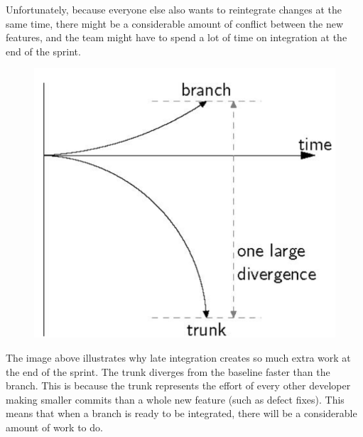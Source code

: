\documentclass[a4paper, openany]{memoir}
\begin{document}
Unfortunately, because everyone else also wants to reintegrate changes at the same time, there might be a considerable amount of conflict between the new features, and the team might have to spend a lot of time on integration at the end of the sprint.

\begin{figure}[H]
    \centering
    \includegraphics[scale=0.5]{src/9.1 normal integration frequency.PNG}
\end{figure}
\noindent The image above illustrates why late integration creates so much extra work at the end of the sprint. The trunk diverges from the baseline faster than the branch. This is because the trunk represents the effort of every other developer making smaller commits than a whole new feature (such as defect fixes). This means that when a branch is ready to be integrated, there will be a considerable amount of work to do. 
\end{document}

